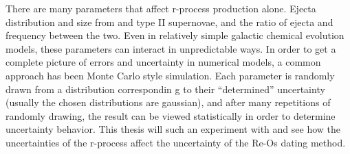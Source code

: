 There are many parameters that affect r-process production alone. Ejecta distribution and size from \nsm and type II supernovae, and the ratio of ejecta and frequency between the two. Even in relatively simple galactic chemical evolution models, these parameters can interact in unpredictable ways. In order to get a complete picture of errors and uncertainty in numerical models, a common approach has been Monte Carlo style simulation. Each parameter is randomly drawn from a distribution correspondin g to their ``determined'' uncertainty (usually the chosen distributions are gaussian), and after many repetitions of randomly drawing, the result can be viewed statistically in order to determine uncertainty behavior.
This thesis will such an experiment with  and see how the uncertainties of the r-process affect the uncertainty of the Re-Os dating method.

%
%
